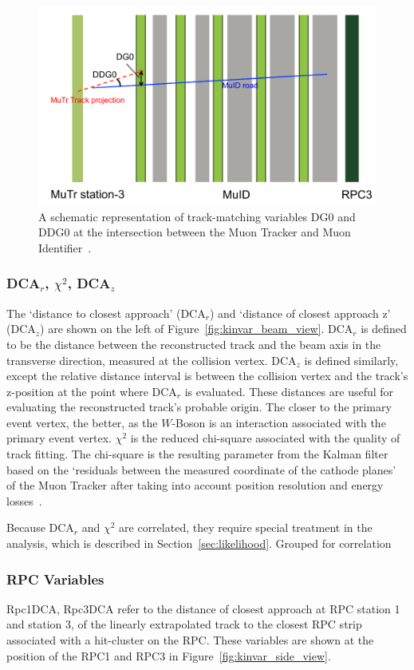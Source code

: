 \begin{figure}[ht]
  \centering
  \includegraphics[width=0.7\linewidth]{./figures/dg0_ddg0.png}
  \caption{
    A schematic representation of track-matching variables DG0 and DDG0 at the
    intersection between the Muon Tracker and Muon Identifier~\cite{Oide2012}.
  }
  \label{fig:dg0_ddg0_schematic}
\end{figure}

\subsubsection{DCA$_r$, $\chi^2$, DCA$_z$}

The `distance to closest approach' (DCA$_r$) and `distance of closest approach
z' (DCA$_z$) are shown on the left of Figure~\ref{fig:kinvar_beam_view}. DCA$_r$
is defined to be the distance between the reconstructed track and the beam axis
in the transverse direction, measured at the collision vertex. DCA$_z$ is
defined similarly, except the relative distance interval is between the
collision vertex and the track's z-position at the point where DCA$_r$ is
evaluated. These
distances are useful for evaluating the reconstructed track's probable origin.
The closer to the primary event vertex, the better, as the $W$-Boson is an
interaction associated with the primary event vertex. $\chi^2$ is the reduced
chi-square associated with the quality of track fitting. The chi-square is the
resulting parameter from the Kalman filter based on the `residuals between the
measured coordinate of the cathode planes' of the Muon Tracker after taking into
account position resolution and energy losses~\cite{Oide2012}.

Because DCA$_r$ and $\chi^2$ are correlated, they require special treatment in
the analysis, which is described in Section~\ref{sec:likelihood}.
Grouped for correlation

\subsubsection{RPC Variables}
Rpc1DCA, Rpc3DCA refer to the distance of closest approach at RPC station 1 and
station 3, of the linearly extrapolated track to the closest RPC strip
associated with a hit-cluster on the RPC. These variables are shown at the
position of the RPC1 and RPC3 in Figure~\ref{fig:kinvar_side_view}.

